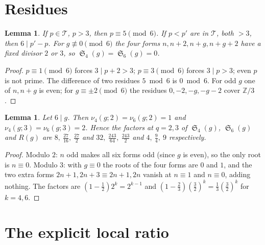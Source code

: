 \documentclass[11pt,a4paper]{article}
\theoremstyle{plain}
\newtheorem{lemma}[theorem]{Lemma}
\theoremstyle{definition}
\theoremstyle{remark}
\newcommand{\Tset}{\mathcal{T}}
\newcommand{\Z}{\mathbb{Z}}
\DeclareMathOperator{\Sing}{\mathfrak S}
\begin{document}
\section{Residues}

\begin{lemma}\label{lem:res}
If $p\in\Tset$, $p>3$, then $p\equiv5\pmod6$.  If $p<p'$ are in $\Tset$,
both $>3$, then $6\mid p'-p$.  For $g\not\equiv0\pmod6$ the four forms
$n,n+2,n+g,n+g+2$ have a fixed divisor $2$ or $3$, so
$\Sing_4(g)=\Sing_6(g)=0$.
\end{lemma}
\begin{proof}
$p\equiv1\pmod 6$ forces $3\mid p+2>3$; $p\equiv 3\pmod 6$ forces $3\mid p>3$;
even $p$ is not prime.  The difference of two residues $5\bmod6$ is
$0\bmod6$.  For odd $g$ one of $n,n+g$ is even; for
$g\equiv\pm2\pmod6$ the residues $0,-2,-g,-g-2$ cover $\Z/3$.
\end{proof}

\begin{lemma}\label{lem:23}
Let $6\mid g$.  Then $\nu_4(g;2)=\nu_6(g;2)=1$ and $\nu_4(g;3)=\nu_6(g;3)=2$.
Hence the factors at $q=2,3$ of $\Sing_4(g)$, $\Sing_6(g)$ and $R(g)$ are
$8,\ \tfrac{27}{16},\ \tfrac{27}2$ and $32,\ \tfrac{243}{64},\ \tfrac{243}2$
and $4,\ \tfrac94,\ 9$ respectively.
\end{lemma}
\begin{proof}
Modulo $2$: $n$ odd makes all six forms odd (since $g$ is even), so the
only root is $n\equiv0$.  Modulo $3$: with $g\equiv0$ the roots of the four
forms are $0$ and $1$, and the two extra forms $2n+1,2n+3\equiv 2n+1, 2n$
vanish at $n\equiv1$ and $n\equiv0$, adding nothing.  The factors are
$(1-\frac12)2^k=2^{k-1}$ and $(1-\frac23)(\frac32)^k=\frac13(\frac32)^k$
for $k=4,6$.
\end{proof}

\section{The explicit local ratio}
\end{document}
